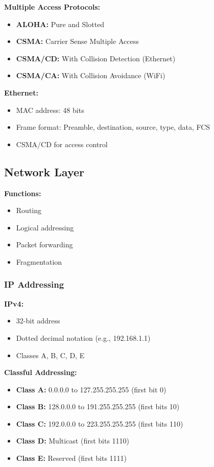 \documentclass[11pt,a4paper]{article}
\begin{document}
\textbf{Multiple Access Protocols:}
\begin{itemize}
    \item \textbf{ALOHA:} Pure and Slotted
    \item \textbf{CSMA:} Carrier Sense Multiple Access
    \item \textbf{CSMA/CD:} With Collision Detection (Ethernet)
    \item \textbf{CSMA/CA:} With Collision Avoidance (WiFi)
\end{itemize}

\textbf{Ethernet:}
\begin{itemize}
    \item MAC address: 48 bits
    \item Frame format: Preamble, destination, source, type, data, FCS
    \item CSMA/CD for access control
\end{itemize}

\subsection{Network Layer}

\textbf{Functions:}
\begin{itemize}
    \item Routing
    \item Logical addressing
    \item Packet forwarding
    \item Fragmentation
\end{itemize}

\subsubsection{IP Addressing}

\textbf{IPv4:}
\begin{itemize}
    \item 32-bit address
    \item Dotted decimal notation (e.g., 192.168.1.1)
    \item Classes A, B, C, D, E
\end{itemize}

\textbf{Classful Addressing:}
\begin{itemize}
    \item \textbf{Class A:} 0.0.0.0 to 127.255.255.255 (first bit 0)
    \item \textbf{Class B:} 128.0.0.0 to 191.255.255.255 (first bits 10)
    \item \textbf{Class C:} 192.0.0.0 to 223.255.255.255 (first bits 110)
    \item \textbf{Class D:} Multicast (first bits 1110)
    \item \textbf{Class E:} Reserved (first bits 1111)
\end{itemize}
\end{document}
